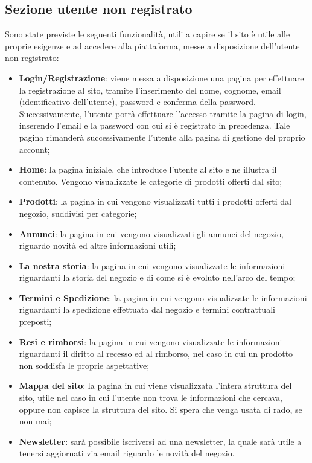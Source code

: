 	\subsection{Sezione utente non registrato}
	Sono state previste le seguenti funzionalità, utili a capire se il sito è utile alle proprie esigenze e ad accedere alla piattaforma, messe a disposizione dell'utente non registrato:
	\begin{itemize}
		\item \textbf{Login/Registrazione}: viene messa a disposizione una pagina per effettuare la registrazione al sito, tramite l'inserimento del nome, cognome, email (identificativo dell'utente), password e conferma della password. Successivamente, l'utente potrà effettuare l'accesso tramite la pagina di login, inserendo l'email e la password con cui si è registrato in precedenza. Tale pagina rimanderà successivamente l'utente alla pagina di gestione del proprio account;
		\item \textbf{Home}: la pagina iniziale, che introduce l'utente al sito e ne illustra il contenuto. Vengono visualizzate le categorie di prodotti offerti dal sito;
		\item \textbf{Prodotti}: la pagina in cui vengono visualizzati tutti i prodotti offerti dal negozio, suddivisi per categorie;
		\item \textbf{Annunci}: la pagina in cui vengono visualizzati gli annunci del negozio, riguardo novità ed altre informazioni utili;
		\item \textbf{La nostra storia}: la pagina in cui vengono visualizzate le informazioni riguardanti la storia del negozio e di come si è evoluto nell'arco del tempo;
		\item \textbf{Termini e Spedizione}: la pagina in cui vengono visualizzate le informazioni riguardanti la spedizione effettuata dal negozio e termini contrattuali preposti;
		\item \textbf{Resi e rimborsi}: la pagina in cui vengono visualizzate le informazioni riguardanti il diritto al recesso ed al rimborso, nel caso in cui un prodotto non soddisfa le proprie aspettative;
		\item \textbf{Mappa del sito}: la pagina in cui viene visualizzata l'intera struttura del sito, utile nel caso in cui l'utente non trova le informazioni che cercava, oppure non capisce la struttura del sito. Si spera che venga usata di rado, se non mai;
		\item \textbf{Newsletter}: sarà possibile iscriversi ad una newsletter, la quale sarà utile a tenersi aggiornati via email riguardo le novità del negozio.
	\end{itemize}
